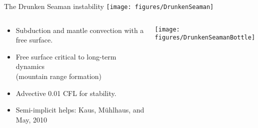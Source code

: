 \begin{frame}[shrink=5]{The Drunken Seaman instability}
  \texttt{[image: figures/DrunkenSeaman]} \\
  \begin{columns}
    \begin{column}{0.8\textwidth}
      \begin{itemize}
      \item Subduction and mantle convection with a free surface.
      \item Free surface critical to long-term dynamics \\
        (\eg mountain range formation)
      \item Advective 0.01 CFL for stability.
      \item Semi-implicit helps: Kaus, M\"uhlhaus, and May, 2010
      \end{itemize}
    \end{column}
    \begin{column}{0.2\textwidth}
      \texttt{[image: figures/DrunkenSeamanBottle]}
    \end{column}
  \end{columns}
\end{frame}
